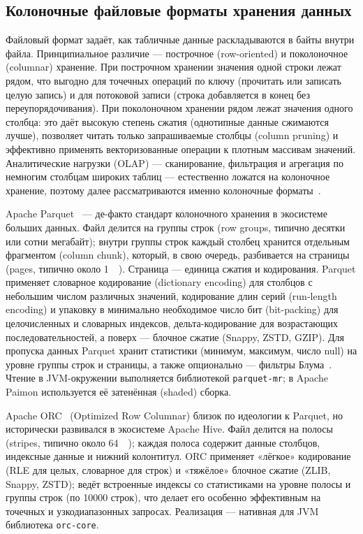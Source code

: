 \subsection{Колоночные файловые форматы хранения данных}\label{subsec:file-formats}

Файловый формат задаёт, как табличные данные раскладываются в байты внутри файла.
Принципиальное различие --- построчное (row-oriented) и поколоночное (columnar)
хранение. При построчном хранении значения одной строки лежат рядом, что выгодно для
точечных операций по ключу (прочитать или записать целую запись) и для потоковой
записи (строка добавляется в конец без переупорядочивания). При поколоночном
хранении рядом лежат значения одного столбца: это даёт высокую степень сжатия
(однотипные данные сжимаются лучше), позволяет читать только запрашиваемые столбцы
(column pruning) и эффективно применять векторизованные операции к плотным массивам
значений. Аналитические нагрузки (OLAP) --- сканирование, фильтрация и агрегация по
немногим столбцам широких таблиц --- естественно ложатся на колоночное хранение,
поэтому далее рассматриваются именно колоночные форматы~\cite{stonebraker2005cstore, abadi2013column}.

Apache Parquet~\cite{parquet-format} --- де-факто стандарт колоночного хранения в экосистеме
больших данных. Файл делится на группы строк (row groups, типично десятки или сотни
мегабайт); внутри группы строк каждый столбец хранится отдельным фрагментом (column
chunk), который, в свою очередь, разбивается на страницы (pages, типично около
\SI{1}{\mega\byte}). Страница --- единица сжатия и кодирования. Parquet применяет
словарное кодирование (dictionary encoding) для столбцов с небольшим числом
различных значений, кодирование длин серий (run-length encoding) и упаковку в
минимально необходимое число бит (bit-packing) для целочисленных и словарных
индексов, дельта-кодирование для возрастающих последовательностей, а поверх ---
блочное сжатие (Snappy, ZSTD, GZIP). Для пропуска данных Parquet хранит статистики
(минимум, максимум, число null) на уровне группы строк и страницы, а также
опционально --- фильтры Блума~\cite{bloom1970space}. Чтение в JVM-окружении выполняется библиотекой
\texttt{parquet-mr}; в Apache Paimon используется её затенённая (shaded) сборка.

Apache ORC~\cite{orc-spec} (Optimized Row Columnar) близок по идеологии к Parquet, но
исторически развивался в экосистеме Apache Hive. Файл делится на полосы (stripes,
типично около \SI{64}{\mega\byte}); каждая полоса содержит данные столбцов, индексные
данные и нижний колонтитул. ORC применяет «лёгкое» кодирование (RLE для целых,
словарное для строк) и «тяжёлое» блочное сжатие (ZLIB, Snappy, ZSTD); ведёт
встроенные индексы со статистиками на уровне полосы и группы строк (по \num{10000}
строк), что делает его особенно эффективным на точечных и узкодиапазонных запросах.
Реализация --- нативная для JVM библиотека \texttt{orc-core}.


